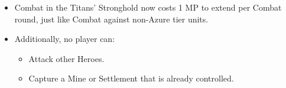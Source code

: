 \begin{multicols*}{2}
\begin{itemize}
  \item Combat in the Titans' Stronghold now costs 1 MP to extend per Combat round, just like Combat against non-Azure tier units.
  \item Additionally, no player can:
  \begin{itemize}
    \item Attack other Heroes.
    \item Capture a Mine or Settlement that is already controlled.
  \end{itemize}
\end{itemize}

\end{multicols*}

\newpage

